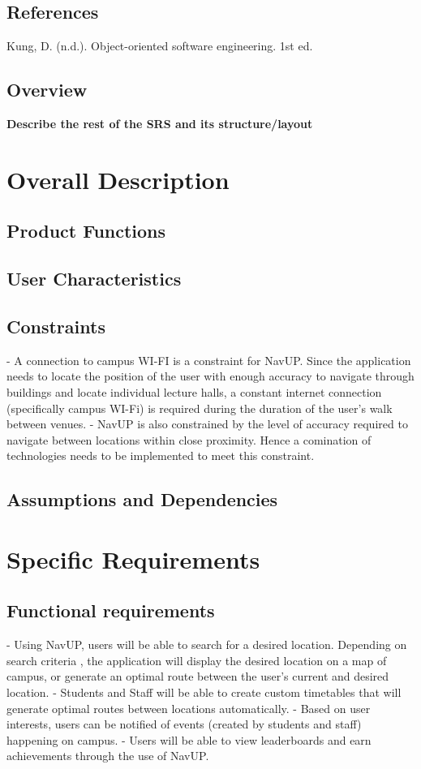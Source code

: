 \documentclass[12pt]{article}
\begin{document}
		
	\subsection{References}
		Kung, D. (n.d.). Object-oriented software engineering. 1st ed.
		
	\subsection{Overview}
		{\bfseries Describe the rest of the SRS and its structure/layout}
	\section{Overall Description}	
	\subsection{Product Functions}
	\subsection{User Characteristics}
	\subsection{Constraints}
	- A connection to campus WI-FI is a constraint for NavUP. Since the application needs to locate the position of the user with enough accuracy to navigate through buildings and locate individual lecture halls, a constant internet connection (specifically campus WI-Fi) is required during the duration of the user’s walk between venues.
	- NavUP is also constrained by the level of accuracy required to navigate between locations within close proximity. Hence a comination of technologies needs to be implemented to meet this constraint.
	
	\subsection{Assumptions and Dependencies}
	\section{Specific Requirements}
	\subsection{Functional requirements}

	- Using NavUP, users will be able to search for a desired location. Depending on search criteria , the application will display the desired location on a map of campus, or generate an optimal route between the user's current and desired location. 
	- Students and Staff will be able to create custom timetables that will generate optimal routes between locations automatically.
	- Based on user interests, users can be notified of events (created by students and staff) happening on campus.
	- Users will be able to view leaderboards and earn achievements through the use of NavUP. 
\end{document}
